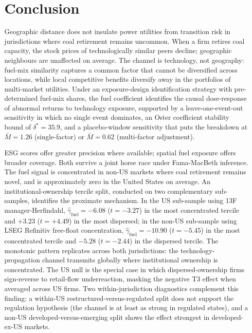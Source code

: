 \documentclass[12pt,a4paper]{article}
\begin{document}
\section{Conclusion}\label{sec:conclusion}

Geographic distance does not insulate power utilities from transition risk in jurisdictions where coal retirement remains uncommon. When a firm retires coal capacity, the stock prices of technologically similar peers decline; geographic neighbours are unaffected on average. The channel is technology, not geography: fuel-mix similarity captures a common factor that cannot be diversified across locations, while local competitive benefits diversify away in the portfolios of multi-market utilities. Under an exposure-design identification strategy \citep{BorusyakHullJaravel2022} with pre-determined fuel-mix shares, the fuel coefficient identifies the causal dose-response of abnormal returns to technology exposure, supported by a leave-one-event-out sensitivity in which no single event dominates, an Oster coefficient stability bound of $\delta^* = 35.9$, and a \citet{RambachanRoth2023} placebo-window sensitivity that puts the breakdown at $\bar{M} = 1.26$ (single-factor) or $\bar{M} = 0.62$ (multi-factor adjustment).

ESG scores offer greater precision where available; spatial fuel exposure offers broader coverage. Both survive a joint horse race under Fama-MacBeth inference. The fuel signal is concentrated in non-US markets where coal retirement remains novel, and is approximately zero in the United States on average. An institutional-ownership tercile split, conducted on two complementary sub-samples, identifies the proximate mechanism. In the US sub-sample using 13F manager-Herfindahl, $\hat\gamma_{\mathrm{fuel}} = -6.08$ ($t = -3.27$) in the most concentrated tercile and $+3.23$ ($t = +4.49$) in the most dispersed; in the non-US sub-sample using LSEG Refinitiv free-float concentration, $\hat\gamma_{\mathrm{fuel}} = -10.90$ ($t = -5.45$) in the most concentrated tercile and $-5.28$ ($t = -2.44$) in the dispersed tercile. The monotonic pattern replicates across both jurisdictions: the technology-propagation channel transmits globally where institutional ownership is concentrated. The US null is the special case in which dispersed-ownership firms sign-reverse to retail-flow underreaction, masking the negative T3 effect when averaged across US firms. Two within-jurisdiction diagnostics complement this finding: a within-US restructured-versus-regulated split does not support the regulation hypothesis (the channel is at least as strong in regulated states), and a non-US developed-versus-emerging split shows the effect strongest in developed-ex-US markets.
\end{document}
